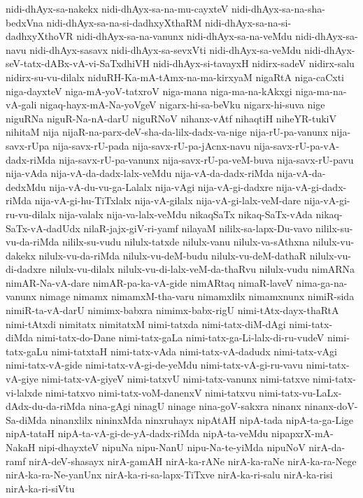 {nidi-dhAyx-sa-nakekx
nidi-dhAyx-sa-na-mu-cayxteV
nidi-dhAyx-sa-na-sha-bedxVna
nidi-dhAyx-sa-na-si-dadhxyXthaRM
nidi-dhAyx-sa-na-si-dadhxyXthoVR
nidi-dhAyx-sa-na-vanunx
nidi-dhAyx-sa-na-veMdu
nidi-dhAyx-sa-navu
nidi-dhAyx-sasavx
nidi-dhAyx-sa-sevxVti
nidi-dhAyx-sa-veMdu
nidi-dhAyx-seV-tatx-dABx-vA-vi-SaTxdhiVH
nidi-dhAyx-si-tavayxH
nidirx-sadeV
nidirx-salu
nidirx-su-vu-dilalx
niduRH-Ka-mA-tAmx-na-ma-kirxyaM
nigaRtA
niga-caCxti
niga-dayxteV
niga-mA-yoV-tatxroV
niga-mana
niga-ma-na-kAkxgi
niga-ma-na-vA-gali
nigaq-hayx-mA-Na-yoVgeV
nigarx-hi-sa-beVku
nigarx-hi-suva
nige
niguRNa
niguR-Na-nA-darU
niguRNoV
nihanx-vAtf
nihaqtiH
niheYR-tukiV
nihitaM
nija
nijaR-na-parx-deV-sha-da-lilx-dadx-va-nige
nija-rU-pa-vanunx
nija-savx-rUpa
nija-savx-rU-pada
nija-savx-rU-pa-jAcnx-navu
nija-savx-rU-pa-vA-dadx-riMda
nija-savx-rU-pa-vanunx
nija-savx-rU-pa-veM-buva
nija-savx-rU-pavu
nija-vAda
nija-vA-da-dadx-lalx-veMdu
nija-vA-da-dadx-riMda
nija-vA-da-dedxMdu
nija-vA-du-vu-ga-Lalalx
nija-vAgi
nija-vA-gi-dadxre
nija-vA-gi-dadx-riMda
nija-vA-gi-hu-TiTxlalx
nija-vA-gilalx
nija-vA-gi-lalx-veM-dare
nija-vA-gi-ru-vu-dilalx
nija-valalx
nija-va-lalx-veMdu
nikaqSaTx
nikaq-SaTx-vAda
nikaq-SaTx-vA-dadUdx
nilaR-jajx-giV-ri-yamf
nilayaM
nililx-sa-lapx-Du-vavo
nililx-su-vu-da-riMda
nililx-su-vudu
nilulx-tatxde
nilulx-vanu
nilulx-va-sAthxna
nilulx-vu-dakekx
nilulx-vu-da-riMda
nilulx-vu-deM-budu
nilulx-vu-deM-dathaR
nilulx-vu-di-dadxre
nilulx-vu-dilalx
nilulx-vu-di-lalx-veM-da-thaRvu
nilulx-vudu
nimARNa
nimAR-Na-vA-dare
nimAR-pa-ka-vA-gide
nimARtaq
nimaR-laveV
nima-ga-na-vanunx
nimage
nimamx
nimamxM-tha-varu
nimamxlilx
nimamxnunx
nimiR-sida
nimiR-ta-vA-darU
nimimx-babxra
nimimx-babx-rigU
nimi-tAtx-dayx-thaRtA
nimi-tAtxdi
nimitatx
nimitatxM
nimi-tatxda
nimi-tatx-diM-dAgi
nimi-tatx-diMda
nimi-tatx-do-Dane
nimi-tatx-gaLa
nimi-tatx-ga-Li-lalx-di-ru-vudeV
nimi-tatx-gaLu
nimi-tatxtaH
nimi-tatx-vAda
nimi-tatx-vA-dadudx
nimi-tatx-vAgi
nimi-tatx-vA-gide
nimi-tatx-vA-gi-de-yeMdu
nimi-tatx-vA-gi-ru-vavu
nimi-tatx-vA-giye
nimi-tatx-vA-giyeV
nimi-tatxvU
nimi-tatx-vanunx
nimi-tatxve
nimi-tatx-vi-lalxde
nimi-tatxvo
nimi-tatx-voM-danenxV
nimi-tatxvu
nimi-tatx-vu-LaLx-dAdx-du-da-riMda
nina-gAgi
ninagU
ninage
nina-goV-sakxra
ninanx
ninanx-doV-Sa-diMda
ninanxlilx
nininxMda
ninxruhayx
nipAtAH
nipA-tada
nipA-ta-ga-Lige
nipA-tataH
nipA-ta-vA-gi-de-yA-dadx-riMda
nipA-ta-veMdu
nipapxrX-mA-NakaH
nipi-dhayxteV
nipuNa
nipu-NanU
nipu-Na-te-yiMda
nipuNoV
nirA-da-ramf
nirA-deV-shasayx
nirA-gamAH
nirA-ka-rANe
nirA-ka-raNe
nirA-ka-ra-Nege
nirA-ka-ra-Ne-yanUnx
nirA-ka-ri-sa-lapx-TiTxve
nirA-ka-ri-salu
nirA-ka-risi
nirA-ka-ri-siVtu
}
